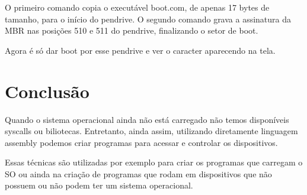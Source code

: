O primeiro comando copia o executável boot.com, de apenas 17 bytes de tamanho, para  o início do pendrive. O segundo comando grava a assinatura da MBR nas posições 510 e 511 do pendrive, finalizando o setor de boot.

Agora é só dar boot por esse pendrive e ver o caracter aparecendo na tela.

\section{Conclusão}

Quando o sistema operacional ainda não está carregado não temos disponíveis syscalls ou biliotecas. Entretanto, ainda assim, utilizando diretamente linguagem assembly podemos criar programas para acessar e controlar os dispositivos.

Essas técnicas são utilizadas por exemplo para criar os programas que carregam o SO ou ainda na criação de programas que rodam em dispositivos que não possuem ou não podem ter um sistema operacional.
